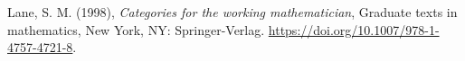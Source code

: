 \documentclass[
  letterpaper,
  DIV=11,
  numbers=noendperiod]{scrartcl}
\newlength{\cslhangindent}
\newenvironment{CSLReferences}[2] %
 {\begin{list}{}{%
  \setlength{\itemindent}{0pt}
  \setlength{\leftmargin}{0pt}
  \setlength{\parsep}{0pt}
  \ifodd #1
   \setlength{\leftmargin}{\cslhangindent}
   \setlength{\itemindent}{-1\cslhangindent}
  \fi
  \setlength{\itemsep}{#2\baselineskip}}}
 {\end{list}}
\theoremstyle{plain}
\theoremstyle{definition}
\theoremstyle{plain}
\theoremstyle{plain}
\theoremstyle{remark}
\begin{document}
\label{refs}
\begin{CSLReferences}{1}{0}
Lane, S. M. (1998), \emph{Categories for the working mathematician},
Graduate texts in mathematics, New York, NY: Springer-Verlag.
\url{https://doi.org/10.1007/978-1-4757-4721-8}.

\end{CSLReferences}
\end{document}
